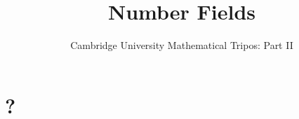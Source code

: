 \documentclass{article}
\title{Number Fields}
\author{Cambridge University Mathematical Tripos: Part II}
\begin{document}
\maketitle

\tableofcontentsnewpage{}

\section{?}

\end{document}
